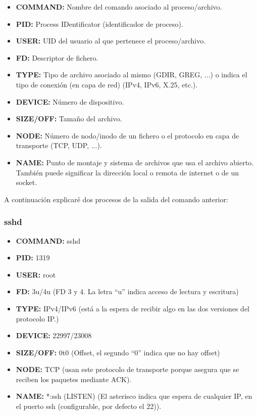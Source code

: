 \documentclass{article}
\begin{document}
\begin{itemize}
    \item \textbf{COMMAND: }Nombre del comando asociado al proceso/archivo.
    \item \textbf{PID: }Process IDentificator (identificador de proceso).
    \item \textbf{USER: }UID del usuario al que pertenece el proceso/archivo.
    \item \textbf{FD: }Descriptor de fichero.
    \item \textbf{TYPE: }Tipo de archivo asociado al mismo (GDIR, GREG, ...) o indica el tipo de conexión (en capa de red) (IPv4, IPv6, X.25, etc.).
    \item \textbf{DEVICE: }Número de dispositivo.
    \item \textbf{SIZE/OFF: }Tamaño del archivo.
    \item \textbf{NODE: }Número de nodo/inodo de un fichero o el protocolo en capa de transporte (TCP, UDP, ...).
    \item \textbf{NAME: }Punto de montaje y sistema de archivos que usa el archivo abierto. También puede significar la dirección local o remota de internet o de un socket.
\end{itemize}

\newpage

A continuación explicaré dos procesos de la salida del comando anterior:

\subsubsection{sshd}
\begin{itemize}
    \item \textbf{COMMAND: }sshd
    \item \textbf{PID: }1319
    \item \textbf{USER: }root
    \item \textbf{FD: }3u/4u (FD 3 y 4. La letra ``u'' indica acceso de lectura y escritura)
    \item \textbf{TYPE: }IPv4/IPv6 (está a la espera de recibir algo en las dos versiones del protocolo IP.)
    \item \textbf{DEVICE: }22997/23008
    \item \textbf{SIZE/OFF: }0t0 (Offset, el segundo ``0'' indica que no hay offset)
    \item \textbf{NODE: }TCP (usan este protocolo de transporte porque asegura que se reciben los paquetes mediante ACK).
    \item \textbf{NAME: }*:ssh (LISTEN) (El asterisco indica que espera de cualquier IP, en el puerto ssh (configurable, por defecto el 22)).
\end{itemize}
\end{document}
